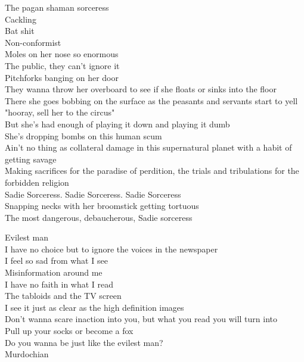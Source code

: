 The pagan shaman sorceress \\
Cackling \\
Bat shit \\
Non-conformist \\
Moles on her nose so enormous \\
The public, they can't ignore it \\
Pitchforks banging on her door \\
They wanna throw her overboard to see if she floats or sinks into the floor \\
There she goes bobbing on the surface as the peasants and servants start to yell "hooray, sell her to the circus" \\
But she's had enough of playing it down and playing it dumb \\
She's dropping bombs on this human scum \\
Ain't no thing as collateral damage in this supernatural planet with a habit of getting savage \\
Making sacrifices for the paradise of perdition, the trials and tribulations for the forbidden religion \\

Sadie Sorceress. Sadie Sorceress. Sadie Sorceress \\
Snapping necks with her broomstick getting tortuous \\

The most dangerous, debaucherous, Sadie sorceress \\




Evilest man \\

I have no choice but to ignore the voices in the newspaper \\
I feel so sad from what I see \\
Misinformation around me \\

I have no faith in what I read \\
The tabloids and the TV screen \\
I see it just as clear as the high definition images \\

Don't wanna scare inaction into you, but what you read you will turn into \\
Pull up your socks or become a fox \\
Do you wanna be just like the evilest man? \\
Murdochian \\

